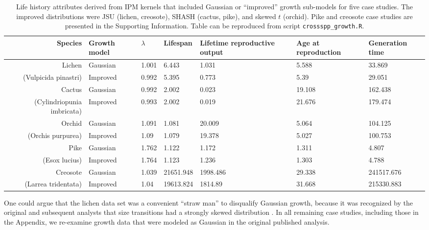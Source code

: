 \documentclass[12pt]{article}
\begin{document}
\begin{table}[tbp]
\renewcommand{\arraystretch}{1.5}
	\centering
	\begingroup\fontsize{9pt}{10pt}\selectfont
	\begin{tabular}{rp{1.5cm}|p{1cm}p{1.5cm}p{1.75cm}p{1.7cm}p{1.5cm}}
		{\textbf{Species}} & {\textbf{Growth model}} & {\textbf{$\lambda$}} & {\textbf{Lifespan}} & {\textbf{Lifetime reproductive output}} & {\textbf{Age at reproduction}} & {\textbf{Generation time}} \\ 
		\hline
		Lichen & Gaussian & 1.001 & 6.443 & 1.031 & 5.588 & 33.869 \\ 
		(Vulpicida pinastri) & Improved & 0.992 & 5.395 & 0.773 & 5.39 & 29.051 \\ 
		\hline
		Cactus & Gaussian & 0.992 & 2.002 & 0.023 & 19.108 & 162.438 \\ 
		(Cylindriopunia imbricata) & Improved & 0.993 & 2.002 & 0.019 & 21.676 & 179.474 \\ 
		\hline
		Orchid & Gaussian & 1.091 & 1.081 & 20.009 & 5.064 & 104.125 \\ 
		(Orchis purpurea) & Improved & 1.09 & 1.079 & 19.378 & 5.027 & 100.753 \\ 
		\hline
		Pike & Gaussian & 1.762 & 1.122 & 1.172 & 1.311 & 4.807 \\ 
		(Esox lucius) & Improved & 1.764 & 1.123 & 1.236 & 1.303 & 4.788 \\ 
		\hline
		Creosote & Gaussian & 1.039 & 21651.948 & 1998.486 & 29.338 & 241517.676 \\ 
		(Larrea tridentata) & Improved & 1.04 & 19613.824 & 1814.89 & 31.668 & 215330.883 \\ 
	\end{tabular}
	\endgroup
	\caption{Life history attributes derived from IPM kernels that included Gaussian or ``improved'' growth sub-models for five case studies. The improved distributions were JSU (lichen, creosote), SHASH (cactus, pike), and skewed $t$ (orchid). Pike and creosote case studies are presented in the Supporting Information. Table can be reproduced from script \texttt{crossspp\_growth.R}.}
	\label{tab:crossspp}
\end{table}

One could argue that the lichen data set was a convenient ``straw man'' to disqualify Gaussian growth, because it was recognized by the original and subsequent analysts that size transitions had a strongly skewed distribution \citep{shriver2012comparative,peterson2019improving}. 
In all remaining case studies, including those in the Appendix, we re-examine growth data that were modeled as Gaussian in the original published analysis.  
\end{document}
